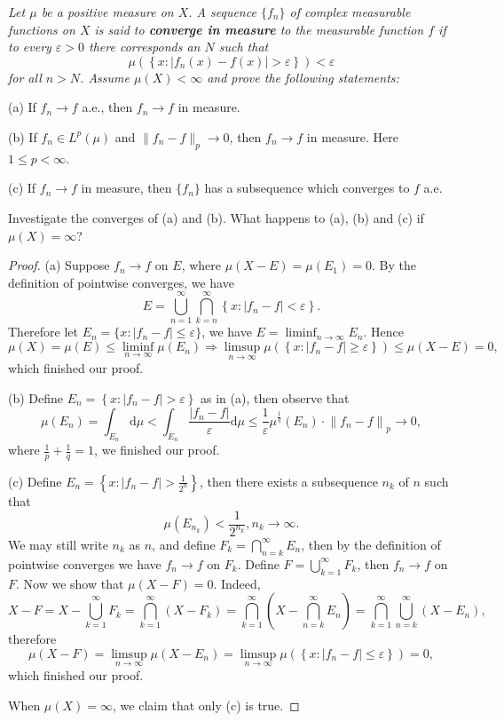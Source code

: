 \begin{problem}\em
Let $\mu$ be a positive measure on $X$. A sequence $\{f_n\}$ of complex measurable functions on $X$ is said to \textbf{converge in measure} to the measurable function $f$ if to every $\varepsilon>0$ there corresponds an $N$ such that 
$$
\mu \left( \left\{ x:\left| f_n\left( x \right) -f\left( x \right) \right|>\varepsilon \right\} \right) <\varepsilon 
$$
for all $n>N$. Assume $\mu(X)<\infty$ and prove the following statements:\par
(a) If $f_n\to f$ a.e., then $f_n\to f$ in measure.\par
(b) If $f_n\in L^p(\mu)$ and $\|f_n-f\|_p\to 0$, then $f_n\to f$ in measure. Here $1\le p<\infty$.\par
(c) If $f_n\to f$ in measure, then $\{f_n\}$ has a subsequence which converges to $f$ a.e.\par
Investigate the converges of (a) and (b). What happens to (a), (b) and (c) if $\mu(X)=\infty$?
\end{problem}
\begin{proof}
(a) Suppose $f_n\to f$ on $E$, where $\mu(X-E)=\mu(E_1)=0$. By the definition of pointwise converges, we have 
$$
E=\bigcup_{n=1}^{\infty}{\bigcap_{k=n}^{\infty}{\left\{ x:\left| f_n-f \right|<\varepsilon \right\}}}.
$$
Therefore let $E_n=\{x:|f_n-f|\le\varepsilon\}$, we have $E=\liminf_{n\to\infty}E_n$. Hence 
$$
\mu \left( X \right) =\mu \left( E \right) \le \mathop {\lim\mathrm{inf}} \limits_{n\rightarrow \infty}\mu \left( E_n \right) \Rightarrow \mathop {\lim\mathrm{sup}} \limits_{n\rightarrow \infty}\mu \left( \left\{ x:\left| f_n-f \right|\ge \varepsilon \right\} \right) \le \mu \left( X-E \right) =0,
$$
which finished our proof.\par
(b) Define $E_n=\left\{ x:\left| f_n-f \right|>\varepsilon \right\} $ as in (a), then observe that 
$$
\mu \left( E_n \right) =\int_{E_n}{\mathrm{d}\mu}<\int_{E_n}{\frac{\left| f_n-f \right|}{\varepsilon}\mathrm{d}\mu}\le \frac{1}{\varepsilon}\mu ^{\frac{1}{q}}\left( E_n \right) \cdot \left\| f_n-f \right\| _p\rightarrow 0,
$$
where $\frac{1}{p}+\frac{1}{q}=1$, we finished our proof.\par
(c) Define $E_n=\left\{ x:\left| f_n-f \right|>\frac{1}{2^n} \right\} $, then there exists a subsequence $n_k$ of $n$ such that 
$$
\mu \left( E_{n_k} \right) <\frac{1}{2^{n_k}},n_k\rightarrow \infty .
$$
We may still write $n_k$ as $n$, and define $F_k=\bigcap_{n=k}^\infty E_n$, then by the definition of pointwise converges we have $f_n\to f$ on $F_k$. Define $F=\bigcup_{k=1}^\infty F_k$, then $f_n\to f$ on $F$. Now we show that $\mu(X-F)=0$. Indeed, 
$$
X-F=X-\bigcup_{k=1}^{\infty}{F_k}=\bigcap_{k=1}^{\infty}{\left( X-F_k \right)}=\bigcap_{k=1}^{\infty}{\left( X-\bigcap_{n=k}^{\infty}{E_n} \right)}=\bigcap_{k=1}^{\infty}{\bigcup_{n=k}^{\infty}{\left( X-E_n \right)}},
$$
therefore 
$$
\mu \left( X-F \right) =\mathop {\lim\mathrm{sup}} \limits_{n\rightarrow \infty}\mu \left( X-E_n \right) =\mathop {\lim\mathrm{sup}} \limits_{n\rightarrow \infty}\mu \left( \left\{ x:\left| f_n-f \right|\le \varepsilon \right\} \right) =0,
$$
which finished our proof.\par
When $\mu(X)=\infty$, we claim that only (c) is true.
\end{proof}
